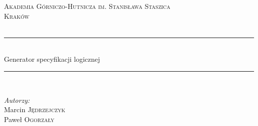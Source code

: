 \documentclass[a4paper, 11pt]{article}
\begin{document}
	
	
	\begin{titlepage}
		
		
		\newcommand{\HRule}{\rule{\linewidth}{0.5mm}} %
		
		\center %
		
		
		\textsc{\LARGE Akademia Górniczo-Hutnicza im. Stanisława Staszica}\\[1.5cm] %
		\textsc{\Large Kraków}\\[0.5cm] %
		\textsc{\large }\\[0.5cm] %
		
		
		\HRule \\[0.4cm]
		{\fontsize{38}{50}\selectfont Generator specyfikacji logicznej}
		\HRule \\[5.5cm]
		
	
\begin{minipage}{0.4\textwidth}
\begin{flushleft} \large 
\emph{Autorzy:}\\
Marcin \textsc{Jędrzejczyk}\\ %
Paweł \textsc{Ogorzały} \\


\end{flushleft}
\end{minipage}
\end{titlepage}
\end{document}
